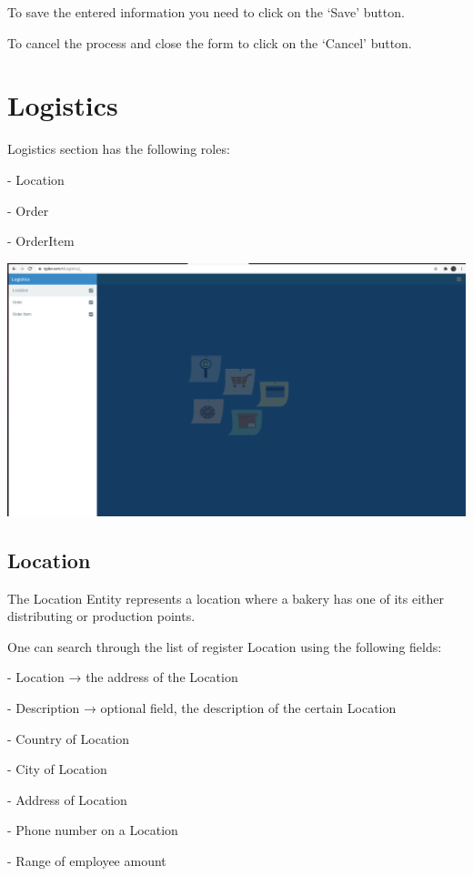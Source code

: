 To save the entered information you need to click on the ‘Save’ button. 

To cancel the process and close the form to click on the ‘Cancel' button.

\section{Logistics}

Logistics section has the following roles: 

- Location 

- Order

- OrderItem

\includegraphics[width=\textwidth]{sections/01-chapter/images/logistics.png}

\subsection{Location}

The Location Entity represents a location where a bakery has one of its either distributing or production points. 

One can search through the list of register Location using the following fields:

- Location → the address of the Location

- Description → optional field, the description of the certain Location 

- Country of Location

- City of Location

- Address of Location

- Phone number on a Location

- Range of employee amount

